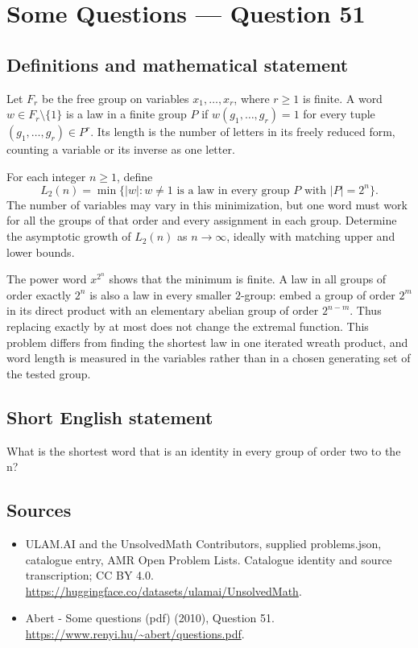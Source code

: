 \documentclass[11pt,a4paper]{article}
\begin{document}
\section*{Some Questions — Question 51}\label{statement}

\subsection{Definitions and mathematical statement}
Let $F_r$ be the free group on variables $x_1,\ldots,x_r$, where $r\geq1$ is finite. A word $w\in F_r\setminus\{1\}$ is a law in a finite group $P$ if $w(g_1,\ldots,g_r)=1$ for every tuple $(g_1,\ldots,g_r)\in P^r$. Its length is the number of letters in its freely reduced form, counting a variable or its inverse as one letter.

For each integer $n\geq1$, define
\[
 L_2(n)=\min\{|w|:w\ne1\text{ is a law in every group }P
                                      \text{ with }|P|=2^n\}.
\]
The number of variables may vary in this minimization, but one word must work for all the groups of that order and every assignment in each group. Determine the asymptotic growth of $L_2(n)$ as $n\to\infty$, ideally with matching upper and lower bounds.

The power word $x^{2^n}$ shows that the minimum is finite. A law in all groups of order exactly $2^n$ is also a law in every smaller $2$-group: embed a group of order $2^m$ in its direct product with an elementary abelian group of order $2^{n-m}$. Thus replacing exactly by at most does not change the extremal function. This problem differs from finding the shortest law in one iterated wreath product, and word length is measured in the variables rather than in a chosen generating set of the tested group.
\subsection{Short English statement}
What is the shortest word that is an identity in every group of order two to the n?
\subsection{Sources}
\begin{itemize}
\item[S1] ULAM.AI and the UnsolvedMath Contributors, supplied problems.json, catalogue entry, AMR Open Problem Lists. Catalogue identity and source transcription; CC BY 4.0.
\url{https://huggingface.co/datasets/ulamai/UnsolvedMath}.
\item[S2] Abert - Some questions (pdf) (2010), Question 51. 
\url{https://www.renyi.hu/~abert/questions.pdf}.
\end{itemize}
\end{document}
